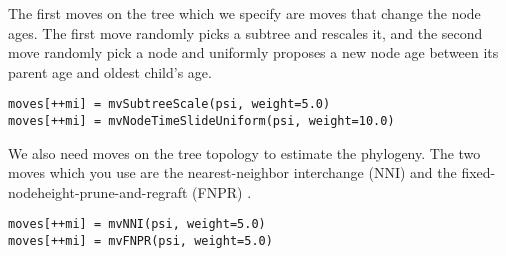 The first moves on the tree which we specify are moves that change the node ages. The first move randomly picks a subtree and rescales it, and the second move randomly pick a node and uniformly proposes a new node age between its parent age and oldest child's age.
{\tt \small \begin{snugshade*}
\begin{lstlisting}
moves[++mi] = mvSubtreeScale(psi, weight=5.0)
moves[++mi] = mvNodeTimeSlideUniform(psi, weight=10.0)
\end{lstlisting}
\end{snugshade*}}

We also need moves on the tree topology to estimate the phylogeny. The two moves which you use are the nearest-neighbor interchange (NNI) and the fixed-nodeheight-prune-and-regraft (FNPR) \citep{Hohna2012}.
{\tt \small \begin{snugshade*}
\begin{lstlisting}
moves[++mi] = mvNNI(psi, weight=5.0)
moves[++mi] = mvFNPR(psi, weight=5.0)\end{lstlisting}
\end{snugshade*}}


